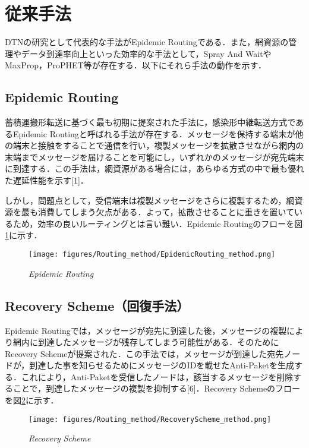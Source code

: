 \documentclass[11pt]{icsthesis}
\begin{document}
\section{従来手法}
DTNの研究として代表的な手法がEpidemic Routingである．また，網資源の管理やデータ到達率向上といった効率的な手法として，Spray And WaitやMaxProp，ProPHET等が存在する．以下にそれら手法の動作を示す．

\subsection{Epidemic Routing}
蓄積運搬形転送に基づく最も初期に提案された手法に，感染形中継転送方式であるEpidemic Routingと呼ばれる手法が存在する．メッセージを保持する端末が他の端末と接触をすることで通信を行い，複製メッセージを拡散させながら網内の末端までメッセージを届けることを可能にし，いずれかのメッセージが宛先端末に到達する．この手法は，網資源がある場合には，あらゆる方式の中で最も優れた遅延性能を示す[1]．

しかし，問題点として，受信端末は複製メッセージをさらに複製するため，網資源を最も消費してしまう欠点がある．よって，拡散させることに重きを置いているため，効率の良いルーティングとは言い難い．Epidemic Routingのフローを図\ref{EpidemicRouting}に示す．

\begin{figure}[h]
	\centering
	\texttt{[image: figures/Routing\_method/EpidemicRouting\_method.png]}
	\caption[]{\it{Epidemic Routing}}
	\label{EpidemicRouting}
\end{figure}

\newpage

\subsection{Recovery Scheme（回復手法）}
Epidemic Routingでは，メッセージが宛先に到達した後，メッセージの複製により網内に到達したメッセージが残存してしまう可能性がある．そのためにRecovery Schemeが提案された．この手法では，メッセージが到達した宛先ノードが，到達した事を知らせるためにメッセージのIDを載せたAnti-Paketを生成する．これにより，Anti-Paketを受信したノードは，該当するメッセージを削除することで，到達したメッセージの複製を抑制する[6]．Recovery Schemeのフローを図\ref{RecoveryScheme}に示す．

\begin{figure}[h]
	\centering
	\texttt{[image: figures/Routing\_method/RecoveryScheme\_method.png]}
	\caption[]{\it{Recovery Scheme}}
	\label{RecoveryScheme}
\end{figure}
\end{document}
